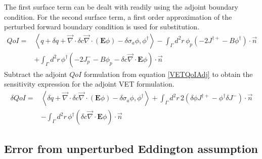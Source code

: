 \documentclass{article}
\newcommand{\bra}{\left\langle}
\newcommand{\ket}{\right\rangle}
\newcommand{\vdiv}{\vec{\nabla} \cdot}
\newcommand{\Edd}{\mathbf{E}}
\newcommand{\siga}{\sigma_a}
\newcommand{\isigt}{c}
\newcommand{\scalSource}{q}
\newcommand{\qoi}{QoI}
\begin{document}
The first surface term can be dealt with readily using the adjoint boundary condition. For the second surface term, a first order approximation of the perturbed forward boundary condition is used for substitution.
\begin{equation}
\label{QoIVETAdj}
\begin{split}
\qoi =& \bra \scalSource + \delta \scalSource + \vdiv \delta \isigt \vdiv \left( \Edd \phi \right) - \delta \siga \phi, \phi^\dag \ket - \int_\Gamma d^2 r \, \phi_p \left( - 2J^{\dag +} - B \phi^\dag \right) \cdot \vec{n} 
\\ &+ \int_\Gamma d^2 r \, \phi^\dag \left( - 2J_p^- - B \phi_p - \delta \isigt \vdiv \Edd \phi \right) \cdot \vec{n} 
\end{split}
\end{equation}
Subtract the adjoint $\qoi$ formulation from equation \ref{VETQoIAdj} to obtain the sensitivity expression for the adjoint VET formulation.
\begin{equation}
\label{SensVETAdjNoBC}
\begin{split}
\delta \qoi =& \bra \delta \scalSource + \vdiv \delta \isigt \vdiv \left( \Edd \phi \right) - \delta \siga \phi, \phi^\dag \ket + \int_\Gamma d^2 r \, 2  \left( \delta \phi J^{\dag +}  - \phi^\dag \delta J^- \right) \cdot \vec{n}
\\ &- \int_\Gamma d^2 r \,  \phi^\dag \left( \delta \isigt \vdiv \Edd \phi \right) \cdot \vec{n} 
\end{split}
\end{equation}


\subsection{Error from unperturbed Eddington assumption}
\end{document}
